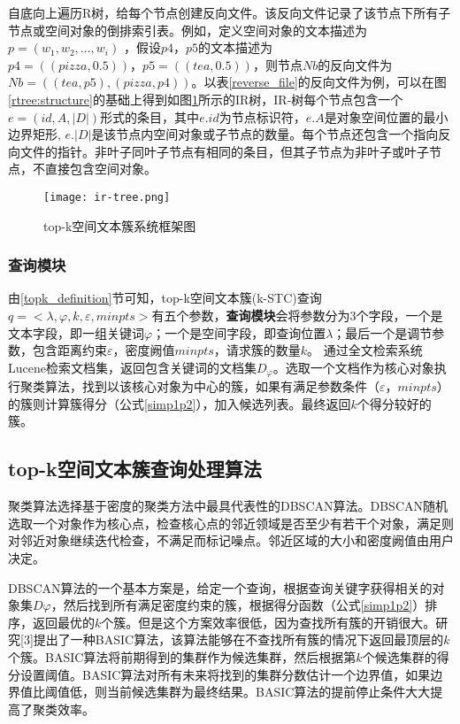 自底向上遍历R树，给每个节点创建反向文件。该反向文件记录了该节点下所有子节点或空间对象的倒排索引表。例如，定义空间对象的文本描述为$p=(w_1,w_2,…,w_i)$ ，假设$p4，p5$的文本描述为$p4 = ((pizza, 0.5))，p5 = ((tea, 0.5))$，则节点$Nb$的反向文件为$Nb = ((tea, p5), (pizza, p4))$。以表\ref{reverse_file}的反向文件为例，可以在图\ref{rtree:structure}的基础上得到如图\ref{ir_tree_example}所示的IR树，IR-树每个节点包含一个$e=(id,A,|D|)$形式的条目，其中$e.id$为节点标识符，$e. A$是对象空间位置的最小边界矩形, $e. \left| D \right|$是该节点内空间对象或子节点的数量。每个节点还包含一个指向反向文件的指针。非叶子同叶子节点有相同的条目，但其子节点为非叶子或叶子节点，不直接包含空间对象。

\begin{figure}[htbp]
	\centering
	\label{ir_tree_example}
	\texttt{[image: ir-tree.png]}
	\caption{top-k空间文本簇系统框架图}
\end{figure}

\subsubsection{查询模块}

由\ref{topk_definition}节可知，top-k空间文本簇(k-STC)查询$q=<\lambda, \varphi, k, \varepsilon, minpts>$有五个参数，\textbf{查询模块}会将参数分为3个字段，一个是文本字段，即一组关键词$\varphi$；一个是空间字段，即查询位置$\lambda$；最后一个是调节参数，包含距离约束$\varepsilon$，密度阙值$minpts$，请求簇的数量$k$。
通过全文检索系统Lucene检索文档集，返回包含关键词的文档集$D_\varphi$。选取一个文档作为核心对象执行聚类算法，找到以该核心对象为中心的簇，如果有满足参数条件$（\varepsilon，minpts）$的簇则计算簇得分（公式\ref{simp1p2}），加入候选列表。最终返回$k$个得分较好的簇。

\subsection{top-k空间文本簇查询处理算法}

聚类算法选择基于密度的聚类方法中最具代表性的DBSCAN算法。DBSCAN随机选取一个对象作为核心点，检查核心点的邻近领域是否至少有若干个对象，满足则对邻近对象继续迭代检查，不满足而标记噪点。邻近区域的大小和密度阙值由用户决定。

DBSCAN算法的一个基本方案是，给定一个查询，根据查询关键字获得相关的对象集$D\varphi$，然后找到所有满足密度约束的簇，根据得分函数（公式\ref{simp1p2}）排序，返回最优的$k$个簇。但是这个方案效率很低，因为查找所有簇的开销很大。研究[3]提出了一种BASIC算法，该算法能够在不查找所有簇的情况下返回最顶层的$k$个簇。BASIC算法将前期得到的集群作为候选集群，然后根据第$k$个候选集群的得分设置阈值。BASIC算法对所有未来将找到的集群分数估计一个边界值，如果边界值比阈值低，则当前候选集群为最终结果。BASIC算法的提前停止条件大大提高了聚类效率。

